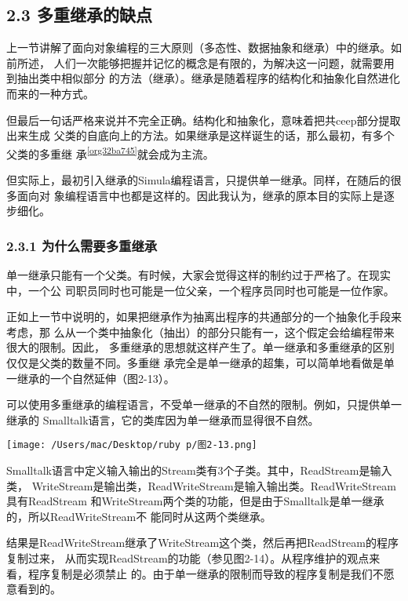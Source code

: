 \documentclass[11pt]{ctexart}
\begin{document}
\subsection{2.3 多重继承的缺点}
\label{sec:org255f196}

上一节讲解了面向对象编程的三大原则（多态性、数据抽象和继承）中的继承。如前所述，
人们一次能够把握并记忆的概念是有限的，为解决这一问题，就需要用到抽出类中相似部分
的方法（继承）。继承是随着程序的结构化和抽象化自然进化而来的一种方式。

但最后一句话严格来说并不完全正确。结构化和抽象化，意味着把共ceep部分提取出来生成
父类的自底向上的方法。如果继承是这样诞生的话，那么最初，有多个父类的多重继
承\textsuperscript{\ref{org32ba745}}就会成为主流。

但实际上，最初引入继承的Simula编程语言，只提供单一继承。同样，在随后的很多面向对
象编程语言中也都是这样的。因此我认为，继承的原本目的实际上是逐步细化。
\subsubsection{2.3.1 为什么需要多重继承}
\label{sec:org3217b3b}

单一继承只能有一个父类。有时候，大家会觉得这样的制约过于严格了。在现实中，一个公
司职员同时也可能是一位父亲，一个程序员同时也可能是一位作家。

正如上一节中说明的，如果把继承作为抽离出程序的共通部分的一个抽象化手段来考虑，那
么从一个类中抽象化（抽出）的部分只能有一，这个假定会给编程带来很大的限制。因此，
多重继承的思想就这样产生了。单一继承和多重继承的区别仅仅是父类的数量不同。多重继
承完全是单一继承的超集，可以简单地看做是单一继承的一个自然延伸（图2-13）。

可以使用多重继承的编程语言，不受单一继承的不自然的限制。例如，只提供单一继承的
Smalltalk语言，它的类库因为单一继承而显得很不自然。
\begin{center}
\texttt{[image: /Users/mac/Desktop/ruby p/图2-13.png]}
\end{center}

Smalltalk语言中定义输入输出的Stream类有3个子类。其中，ReadStream是输入类，
WriteStream是输出类，ReadWriteStream是输入输出类。ReadWriteStream具有ReadStream
和WriteStream两个类的功能，但是由于Smalltalk是单一继承的，所以ReadWriteStream不
能同时从这两个类继承。

结果是ReadWriteStream继承了WriteStream这个类，然后再把ReadStream的程序复制过来，
从而实现ReadStream的功能（参见图2-14）。从程序维护的观点来看，程序复制是必须禁止
的。由于单一继承的限制而导致的程序复制是我们不愿意看到的。
\end{document}
